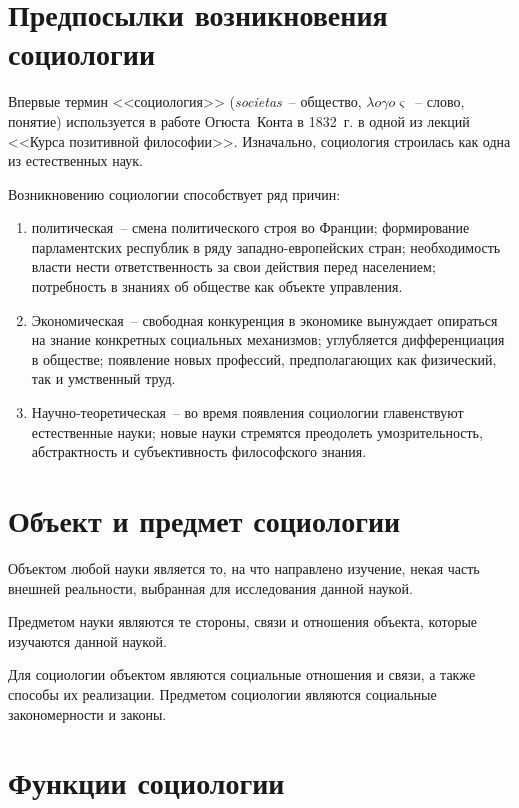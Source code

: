   \section{Предпосылки возникновения социологии}

    Впервые термин <<социология>> (\emph{societas}~-- общество,
    \( \lambda o\gamma o\varsigma \)~-- слово, понятие) используется в работе
    Огюста~Конта в 1832~г. в одной из лекций <<Курса позитивной философии>>.
    Изначально, социология строилась как одна из естественных наук.

    Возникновению социологии способствует ряд причин:
    \begin{enumerate}
      \item политическая~-- смена политического строя во Франции; формирование
        парламентских республик в ряду западно-европейских стран; необходимость
        власти нести ответственность за свои действия перед населением;
        потребность в знаниях об обществе как объекте управления.
      \item Экономическая~-- свободная конкуренция в экономике вынуждает
        опираться на знание конкретных социальных механизмов; углубляется
        дифференциация в обществе; появление новых профессий, предполагающих как
        физический, так и умственный труд.
      \item Научно-теоретическая~-- во время появления социологии главенствуют
        естественные науки; новые науки стремятся преодолеть умозрительность,
        абстрактность и субъективность философского знания.
    \end{enumerate}

  \section{Объект и предмет социологии}

    Объектом любой науки является то, на что направлено изучение, некая часть
    внешней реальности, выбранная для исследования данной наукой.

    Предметом науки являются те стороны, связи и отношения объекта, которые
    изучаются данной наукой.

    Для социологии объектом являются социальные отношения и связи, а также
    способы их реализации. Предметом социологии являются социальные
    закономерности и законы.

  \section{Функции социологии}

